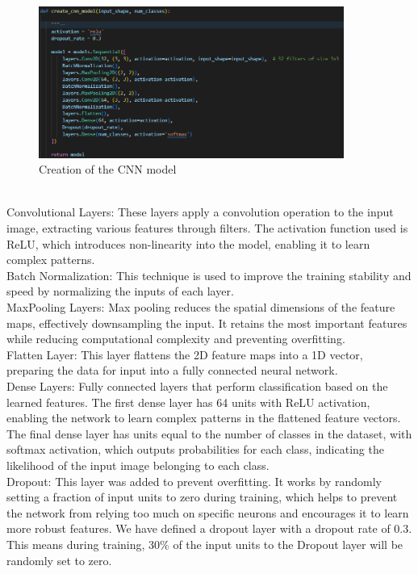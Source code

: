 \documentclass{article}
\begin{document}
\begin{figure}[H]
    \caption{Creation of the CNN model}
    \centering
    \includegraphics[width=10cm]{../imgFolder/create_cnn_model.png}
\end{figure}
\text{ }\\
Convolutional Layers: These layers apply a convolution operation to the input image,
extracting various features through filters.
The activation function used is ReLU,
which introduces non-linearity into the model, enabling it to learn complex patterns.\\\newline
Batch Normalization: This technique is used to improve the training stability and speed
by normalizing the inputs of each layer.\\\newline
MaxPooling Layers: Max pooling reduces the spatial dimensions of the feature maps,
effectively downsampling the input.
It retains the most important features while reducing computational
complexity and preventing overfitting.\\\newline
Flatten Layer: This layer flattens the 2D feature maps into a 1D vector,
preparing the data for input into a fully connected neural network.\\\newline
Dense Layers: Fully connected layers that perform classification based on the learned features.
The first dense layer has 64 units with ReLU activation, enabling the network to learn complex
patterns in the flattened feature vectors.
The final dense layer has units equal to the number of classes
in the dataset, with softmax activation, which outputs probabilities for each class,
indicating the likelihood of the input image belonging to each class.\\\newline
Dropout: This layer was added to prevent overfitting.
It works by randomly setting a fraction of input units to zero during training,
which helps to prevent the network from relying too much on specific neurons
and encourages it to learn more robust features.
We have defined a dropout layer with a dropout rate of 0.3.
This means during training, ${30\%}$ of the input units to the Dropout layer will be randomly set to zero.\\\newline
\end{document}
